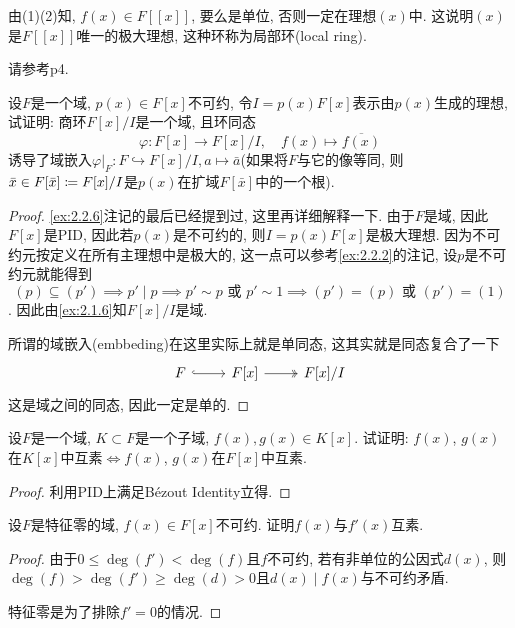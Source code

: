 \begin{remark}
    由(1)(2)知, $f(x) \in F[[x]]$, 要么是单位, 否则一定在理想$(x)$中. 这说明$(x)$是$F[[x]]$唯一的极大理想, 这种环称为局部环(local ring).
    
    请参考\cite{atiyah1994introduction}p4.
\end{remark}

\begin{problem}
    设$F$是一个域, $p(x) \in F[x]$不可约, 令$I = p(x)F[x]$表示由$p(x)$生成的理想, 试证明: 商环$F[x]/I$是一个域, 且环同态
    \[
        \varphi:F[x] \to F[x]/I,\quad f(x) \mapsto \overline{f(x)}
    \]
    诱导了域嵌入$\varphi|_F: F \hookrightarrow F[x]/I, a \mapsto \bar{a}$(如果将$F$与它的像等同, 则$\bar{x} \in F[\bar{x}] \mathrel{\coloneqq} F[x]/I$是$p(x)$在扩域$F[\bar{x}]$中的一个根).
\end{problem}

\begin{proof}
    \ref{ex:2.2.6}注记的最后已经提到过, 这里再详细解释一下. 由于$F$是域, 因此$F[x]$是PID, 因此若$p(x)$是不可约的, 则$I = p(x)F[x]$是极大理想. 因为不可约元按定义在所有主理想中是极大的, 这一点可以参考\ref{ex:2.2.2}的注记, 设$p$是不可约元就能得到
    \[
        (p) \subseteq (p') \implies p' \mid p \implies p' \sim p \text{ 或 } p' \sim 1 \implies (p') = (p) \text{ 或 } (p') = (1)
    \]. 因此由\ref{ex:2.1.6}知$F[x]/I$是域.
    
    所谓的域嵌入(embbeding)在这里实际上就是单同态, 这其实就是同态复合了一下
    \[
        \begin{tikzcd}
            F \arrow[r, hook] & {F[x]} \arrow[r, two heads] & {F[x]/I}
        \end{tikzcd}
    \]
    这是域之间的同态, 因此一定是单的.
\end{proof}

\begin{problem}
    设$F$是一个域, $K \subset F$是一个子域, $f(x), g(x) \in K[x]$. 试证明: $f(x)$, $g(x)$在$K[x]$中互素$\Leftrightarrow f(x)$, $g(x)$在$F[x]$中互素.
\end{problem}

\begin{proof}
    利用PID上满足Bézout Identity立得.
\end{proof}

\begin{problem}
    设$F$是特征零的域, $f(x) \in F[x]$不可约. 证明$f(x)$与$f'(x)$互素.
\end{problem}

\begin{proof}
    由于$0 \leqslant \deg(f') < \deg(f)$且$f$不可约, 若有非单位的公因式$d(x)$, 则$\deg(f) > \deg(f') \geqslant \deg(d) > 0$且$d(x) \mid f(x)$与不可约矛盾.

    特征零是为了排除$f' = 0$的情况.
\end{proof}

